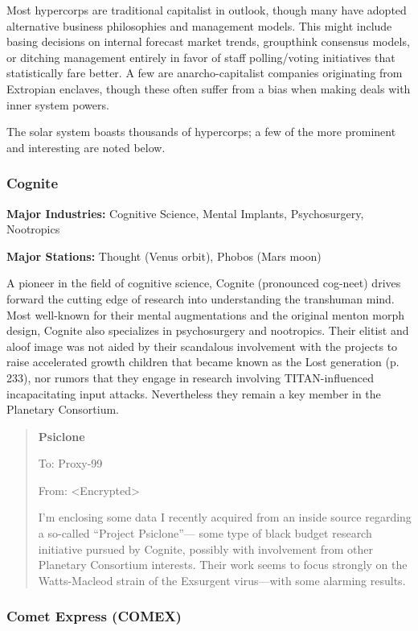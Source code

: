 Most hypercorps are traditional capitalist in outlook, though many have adopted alternative business philosophies and management models. This might include basing decisions on internal forecast market trends, groupthink consensus models, or ditching management entirely in favor of staff polling/voting initiatives that statistically fare better. A few are anarcho-capitalist companies originating from Extropian enclaves, though these often suffer from a bias when making deals with inner system powers. 

The solar system boasts thousands of hypercorps; a few of the more prominent and interesting are noted below. 

\subsubsection{Cognite} \label{sec:cognite} 

\textbf{Major Industries:} Cognitive Science, Mental Implants, Psychosurgery, Nootropics 

\textbf{Major Stations:} Thought (Venus orbit), Phobos (Mars moon) 

A pioneer in the field of cognitive science, Cognite (pronounced cog-neet) drives forward the cutting edge of research into understanding the transhuman mind. Most well-known for their mental augmentations and the original menton morph design, Cognite also specializes in psychosurgery and nootropics. Their elitist and aloof image was not aided by their scandalous involvement with the projects to raise accelerated growth children that became known as the Lost generation (p. 233), nor rumors that they engage in research involving TITAN-influenced incapacitating input attacks. Nevertheless they remain a key member in the Planetary Consortium. 

\begin{quotation} \textbf{Psiclone} 

To: Proxy-99 

From: <Encrypted> 

I'm enclosing some data I recently acquired from an inside source regarding a so-called “Project Psiclone”— some type of black budget research initiative pursued by Cognite, possibly with involvement from other Planetary Consortium interests. Their work seems to focus strongly on the Watts-Macleod strain of the Exsurgent virus—with some alarming results. \end{quotation} 

\subsubsection{Comet Express (COMEX)} \label{sec:comet-express-comex} 

